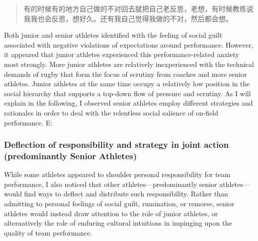 \begin{CJK}{UTF8}{gbsn}
      \begin{quote}
        有的时候有的地方自己做的不对回去就把自己老反思，老想，有时候教练说我我也会反思，想好久。还有我自己觉得我做的不对，然后都会想。
      \end{quote}


Both junior and senior athletes identified with the feeling of social guilt associated with negative violations of expectations around performance.  However, it appeared that junior athletes experienced this performance-related anxiety most strongly.  More junior athletes are relatively inexperienced with the technical demands of rugby that form the focus of scrutiny from coaches and more senior athletes.  Junior athletes at the same time occupy a relatively low position in the social hierarchy that supports a top-down flow of pressure and scrutiny.  As I will explain in the following, I observed senior athletes employ different strategies and rationales in order to deal with the relentless social salience of on-field performance.
E:

\subsubsection{Deflection of responsibility and strategy in joint action (predominantly Senior Athletes)\label{sect:seniorDeflection}}

While some athletes appeared to shoulder personal responsibility for team performance, I also noticed that other athletes---predominantly senior athletes---would find ways to deflect and distribute such responsibility. Rather than admitting to personal feelings of social guilt, rumination, or remorse, senior athletes would instead draw attention to the role of junior athletes, or alternatively the role of enduring cultural intuitions in impinging upon the quality of team performance.


\end{CJK}
